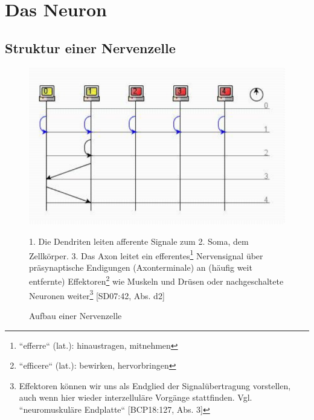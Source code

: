 \chapter{Das Neuron}

\section{Struktur einer Nervenzelle}

\begin{figure}[h]
	\centering
		\includegraphics{images/p1ReadSeq.pdf}
\caption{Aufbau einer Nervenzelle}
\small
 1. Die Dendriten leiten
 afferente Signale zum
 2. Soma, dem Zellkörper.
 3. Das Axon leitet ein
 efferentes\footnote{``efferre`` (lat.): hinaustragen, mitnehmen} Nervensignal über präsynaptische Endigungen (Axonterminale) an (häufig weit entfernte)
 Effektoren\footnote{``efficere`` (lat.): bewirken, hervorbringen}
    wie Muskeln und Drüsen oder nachgeschaltete Neuronen
 weiter\footnote{Effektoren können wir uns als Endglied der Signalübertragung vorstellen, auch wenn hier wieder interzelluläre Vorgänge stattfinden. Vgl. ``neuromuskuläre Endplatte`` {[BCP18:127, Abs. 3]}} {[SD07:42, Abs. d2]}

\end{figure}



